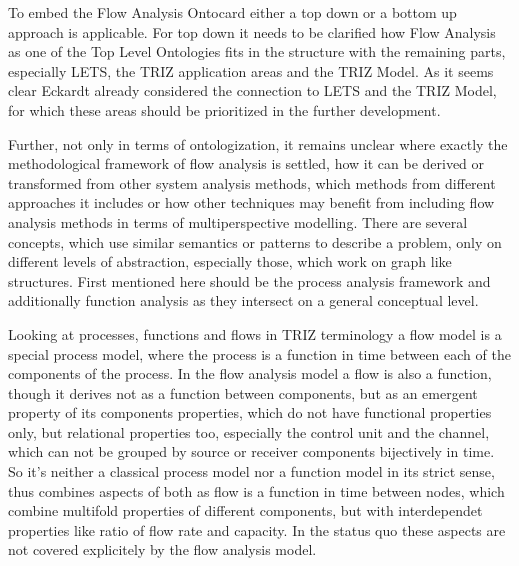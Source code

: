 \documentclass[a4paper,11pt]{article}
\begin{document}
\begin{itemize}
        To embed the Flow Analysis Ontocard either a top down or a bottom up 
        approach is applicable. For top down it needs to be clarified how Flow 
        Analysis as one of the Top Level Ontologies fits in the structure with 
        the remaining parts, especially LETS, the TRIZ application areas and
        the TRIZ Model. As it seems clear Eckardt already considered the 
        connection to LETS and the TRIZ Model, for which these areas should be 
        prioritized in the further development.
        
        Further, not only in terms of ontologization, it remains unclear where 
        exactly the methodological framework of flow analysis is settled, how 
        it can be derived or transformed from other system analysis methods, 
        which methods from different approaches it includes or how other 
        techniques may benefit from including flow analysis methods in terms of
        multiperspective modelling. There are several concepts, which use 
        similar semantics or patterns to describe a problem, only on different 
        levels of abstraction, especially those, which work on graph like 
        structures. First mentioned here should be the process analysis 
        framework and additionally function analysis as they intersect on a 
        general conceptual level.

        Looking at processes, functions and flows in TRIZ terminology 
        \cite{Souchkov2018} \cite{Eckardt2020} a flow model is a special 
        process model, where the process is a function in time between each of
        the components of the process. \cite{KoltzeSouchkov2017} In the flow 
        analysis model a flow is also a function, though it derives not as a 
        function between components, but as an emergent property of its 
        components properties, which do not have functional properties only, 
        but relational properties too, especially the control unit and the 
        channel, which can not be grouped by source or receiver components 
        bijectively in time. So it's neither a classical process model nor a 
        function model in its strict sense, thus combines aspects of both as 
        flow is a function in time between nodes, which combine multifold 
        properties of different components, but with interdependet properties 
        like ratio of flow rate and capacity. In the status quo these aspects 
        are not covered explicitely by the flow analysis model.


\end{itemize}
\end{document}

